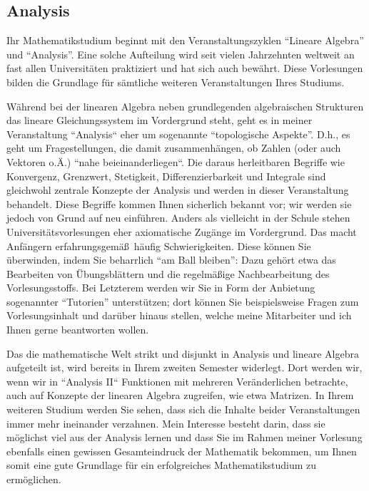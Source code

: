 \subsection{Analysis}

Ihr Mathematikstudium beginnt mit den Veranstaltungszyklen ``Lineare Algebra''
und ``Analysis''. Eine solche Aufteilung wird seit vielen Jahrzehnten weltweit
an fast allen Universit\"aten praktiziert und hat sich auch bew\"ahrt.  Diese
Vorlesungen bilden die Grundlage f\"ur s\"amtliche weiteren Veranstaltungen
Ihres Studiums.

W\"ahrend bei der linearen Algebra neben grundlegenden algebraischen Strukturen
das lineare Gleichungssystem im Vordergrund steht, geht es in meiner
Veranstaltung ``Analysis`` eher um sogenannte ``topologische Aspekte''. D.h.,
es geht um Fragestellungen, die damit zusammenh\"angen, ob Zahlen (oder auch
Vektoren o.\"A.) ``nahe beieinanderliegen``. Die daraus herleitbaren Begriffe
wie Konvergenz, Grenzwert, Stetigkeit, Differenzierbarkeit und Integrale sind
gleichwohl zentrale Konzepte der Analysis und werden in dieser Veranstaltung
behandelt. Diese Begriffe kommen Ihnen sicherlich bekannt vor; wir werden sie
jedoch von Grund auf neu einf\"uhren.  Anders als vielleicht in der Schule
stehen Universit\"atsvorlesungen eher axiomatische Zug\"ange im Vordergrund.
Das macht Anf\"angern erfahrungsgem\"a\ss\ h\"aufig Schwierigkeiten. Diese
k\"onnen Sie \"uberwinden, indem Sie beharrlich ``am Ball bleiben'': Dazu
geh\"ort etwa das Bearbeiten von \"Ubungsbl\"attern und die regelm\"a\ss ige
Nachbearbeitung des Vorlesungsstoffs. Bei Letzterem werden wir Sie in Form der
Anbietung sogenannter ``Tutorien'' unterst\"utzen; dort k\"onnen Sie
beispielsweise Fragen zum Vorlesungsinhalt und darüber hinaus stellen, welche
meine Mitarbeiter und ich Ihnen gerne beantworten wollen.

Das die mathematische Welt strikt und disjunkt in Analysis und lineare Algebra
aufgeteilt ist, wird bereits in Ihrem zweiten Semester widerlegt. Dort werden
wir, wenn wir in ``Analysis II`` Funktionen mit mehreren Ver\"anderlichen
betrachte, auch auf Konzepte der linearen Algebra zugreifen, wie etwa Matrizen.
In Ihrem weiteren Studium werden Sie sehen, dass sich die Inhalte beider
Veranstaltungen immer mehr ineinander verzahnen. Mein Interesse besteht darin,
dass sie m\"oglichst viel aus der Analysis lernen und dass Sie im Rahmen meiner
Vorlesung ebenfalls einen gewissen Gesamteindruck der Mathematik bekommen, um
Ihnen somit eine gute Grundlage f\"ur ein erfolgreiches Mathematikstudium zu
erm\"oglichen.

